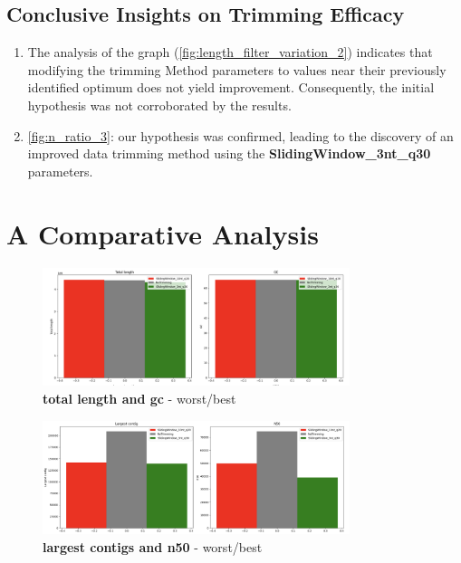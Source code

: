 \subsection{Conclusive Insights on Trimming Efficacy}

\begin{enumerate}
    \item The analysis of the graph (\autoref{fig:length_filter_variation_2}) indicates that modifying the \gls{trimming} Method parameters to values near their previously identified optimum does not yield improvement. Consequently, the initial hypothesis was not corroborated by the results.
    \item \autoref{fig:n_ratio_3}: our hypothesis was confirmed, leading to the discovery of an improved data \gls{trimming} method using the \textbf{SlidingWindow\_3nt\_q30} parameters.
\end{enumerate}


\section{A Comparative Analysis}

\begin{figure}[!ht]
    \centering
    \includegraphics[width=0.8\textwidth]{resources/images/total_length_gc.png}
    \caption{\textbf{\gls{total length} and \gls{gc}} - worst/best}
    \label{fig:total_length_gc}
\end{figure}

\begin{figure}[!ht]
    \centering
    \includegraphics[width=0.8\textwidth]{resources/images/largest_contig_n50.png}
    \caption{\textbf{\gls{largest contigs} and \gls{n50}} - worst/best}
    \label{fig:largest_contig_n50}
\end{figure}


